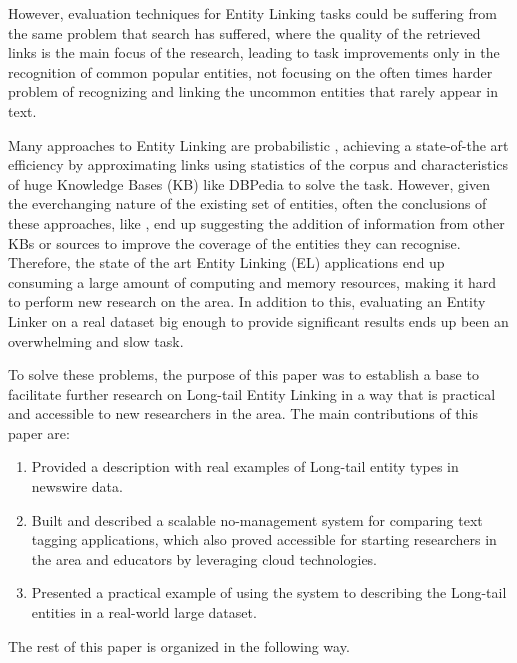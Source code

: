 However, evaluation techniques for Entity Linking tasks could be suffering from the same problem that search has suffered\cite{webpatterns}, where the quality
of the retrieved links is the main focus of the research, leading to task improvements only in the recognition of common popular entities, not focusing on the
often times harder problem of recognizing and linking the uncommon entities that rarely appear in text.

Many approaches to Entity Linking are probabilistic \cite{probabilistic, rw_elo_morsey2012dbpedia, rw_elo_Nadeau2009},
achieving a state-of-the art efficiency by approximating links using statistics of the corpus and characteristics of huge Knowledge Bases (KB) like DBPedia
\cite{rw_elo_morsey2012dbpedia} to solve the task.
However, given the everchanging nature of the existing set of entities, often the conclusions of these approaches, like \cite{probabilistic}, end up suggesting
the addition of information from other KBs or sources to improve the coverage of the entities they can recognise.
Therefore, the state of the art Entity Linking (EL) applications end up consuming a large amount of computing and memory resources, making it hard to perform new research on the area.
In addition to this, evaluating an Entity Linker on a real dataset big enough to provide significant results ends up been an overwhelming and slow task.

To solve these problems, the purpose of this paper was to establish a base to facilitate further research on Long-tail Entity Linking
in a way that is practical and accessible to new researchers in the area.
The main contributions of this paper are:
\begin{enumerate}
  \item Provided a description with real examples of Long-tail entity types in newswire data.
  \item Built and described a scalable no-management system for comparing text tagging applications, which also proved accessible for starting researchers in the area and educators by leveraging cloud technologies.
  \item Presented a practical example of using the system to describing the Long-tail entities in a real-world large dataset.
\end{enumerate}

The rest of this paper is organized in the following way. 
